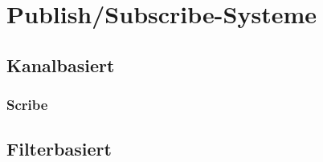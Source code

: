 \section{Publish/Subscribe-Systeme}

\subsection{Kanalbasiert}
\subsubsection{Scribe}
\cite{citeulike:345316} %


\subsection{Filterbasiert}
\cite{citeulike:854573}
\cite{citeulike:6674153} %
\cite{citeulike:4291} %

